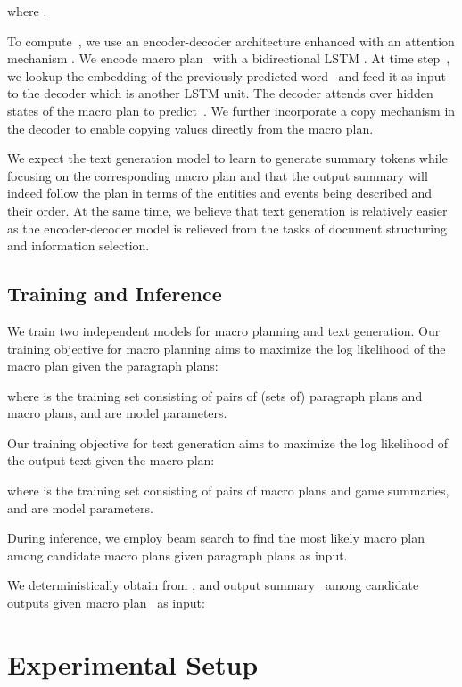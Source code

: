 \documentclass[11pt,a4paper]{article}
\begin{document}
where .

To compute~, we use an encoder-decoder architecture enhanced
with an attention mechanism
\cite{DBLP:journals/corr/BahdanauCB14,luong-etal-2015-effective}. We
encode macro plan~ with a bidirectional LSTM
\cite{hochreiter1997long}.
At time step~, we lookup the embedding of the previously predicted
word~ and feed it as input to the decoder which is another
LSTM
unit. The decoder attends over hidden states of the macro plan to
predict~. We further incorporate a copy mechanism
\cite{gulcehre-etal-2016-pointing} in the decoder to enable copying
values directly from the macro plan.

We expect the text generation model to learn to generate summary
tokens while focusing on the corresponding macro plan and that the
output summary will indeed follow the plan in terms of the entities
and events being described and their
order.  At the same time, we believe that text generation is relatively easier
as the encoder-decoder model is relieved from the tasks of document
structuring and information selection.


\subsection{Training and Inference}
We train two independent models for macro planning and text 
generation.
Our training objective for macro planning aims to maximize the log 
likelihood of the
macro plan given the paragraph plans:

where  is the training set consisting of pairs of (sets
of) paragraph plans and macro plans, and  are model
parameters.

Our training objective for text generation aims to maximize the log 
likelihood of the output text given the macro plan:

where  is the training set consisting of pairs of macro plans 
and game summaries, and  are model parameters.

During inference, we employ beam search to find the most likely 
macro plan  among candidate macro plans  given paragraph plans 
as input.

We deterministically obtain  from , and output summary
~among candidate outputs  given macro plan~ as
input:





\section{Experimental Setup}
\label{sec:experimental-setup}
\end{document}
